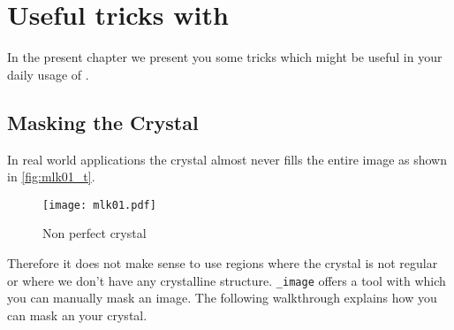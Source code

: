 \section{Useful tricks with {\twodx}}

In the present chapter we present you some tricks which might be useful in your daily usage of {\twodx}.

\subsection{Masking the Crystal}

In real world applications the crystal almost never fills the entire image as shown in \autoref{fig:mlk01_t}.

\begin{figure}[H]
	\centering
	\texttt{[image: mlk01.pdf]}
	\caption{Non perfect crystal}
	\label{fig:mlk01_t}
\end{figure}

Therefore it does not make sense to use regions where the crystal is not regular or where we don't have any crystalline structure. {\twodx}\texttt{\_image} offers a tool with which you can manually mask an image. The following walkthrough explains how you can mask an your crystal.



